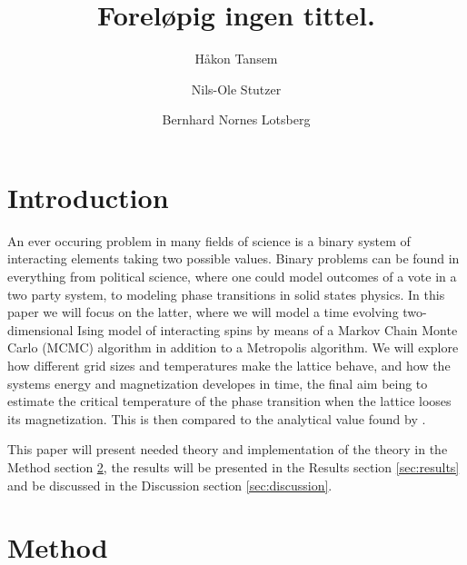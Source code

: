 \documentclass[twocolumn]{aastex62}
\begin{document}
\title{\Large Foreløpig ingen tittel.}

\author{Håkon Tansem}

\author{Nils-Ole Stutzer}

\author{Bernhard Nornes Lotsberg}

\begin{abstract}

\end{abstract}

\section{Introduction} \label{sec:intro}
An ever occuring problem in many fields of science is a binary system of
interacting elements taking two possible values. Binary problems can be found in
everything from political science, where one could model outcomes of a vote in a
two party system, to modeling phase transitions in solid states physics. In this
paper we will focus on the latter, where we will model a time evolving
two-dimensional Ising model of interacting spins by means of a Markov Chain
Monte Carlo (MCMC) algorithm in addition to a Metropolis algorithm. We will explore how
different grid sizes and temperatures make the lattice behave, and how the systems energy and magnetization
developes in time, the final aim being to estimate the critical temperature of
the phase transition when the lattice looses its magnetization. This is then
compared to the analytical value found by \cite{onsager:1944}. 

This paper will present needed theory and implementation of the theory in the Method
section \ref{sec:method}, the results will be presented in the Results section
\ref{sec:results} and be discussed in the Discussion section
\ref{sec:discussion}.

\section{Method} \label{sec:method}
\end{document}
